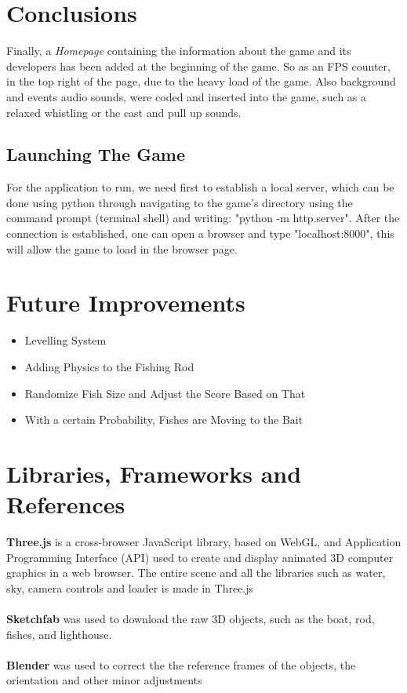 \documentclass[paper=a4, fontsize=11pt]{scrartcl} %
\numberwithin{equation}{section} %
\numberwithin{figure}{section} %
\numberwithin{table}{section} %
\begin{document}
\newpage
\section{Conclusions}
Finally, a \textit{Homepage} containing the information about the game and its developers has been added at the beginning of the game. So as an FPS counter, in the top right of the page, due to the heavy load of the game. Also background and events audio sounds, were coded and inserted into the game, such as a relaxed whistling or the cast and pull up sounds.

\subsection{Launching The Game}
For the application to run, we need first to establish a local server, which can be done using python through navigating to the game's directory using the command prompt (terminal shell) and writing: "python -m http.server". After the connection is established, one can open a browser and type "localhost:8000", this will allow the game to load in the browser page.

\section{Future Improvements}
\begin{itemize}
\item  Levelling System
\item Adding Physics to the Fishing Rod
\item Randomize Fish Size and Adjust the Score Based on That
\item With a certain Probability, Fishes are Moving to the Bait
\end{itemize}

\section{Libraries, Frameworks and References}
\textbf{Three.js} is a cross-browser JavaScript library, based on WebGL, and Application Programming Interface (API) used to create and display animated 3D computer graphics in a web browser.  The entire scene and all the libraries such as water, sky, camera controls and loader is made in Three.js
\\~\\
\textbf{Sketchfab} was used to download the raw 3D objects, such as the boat, rod, fishes, and lighthouse.
\\~\\
\textbf{Blender} was used to correct the the reference frames of the objects, the orientation and other minor adjustments
\end{document}
